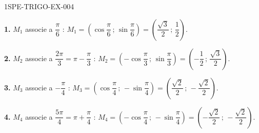 \begin{corrige}{1SPE-TRIGO-EX-004}


\textbf{1.} $M_1$ associe a $\dfrac{\pi}{6}$ : $M_1 = \left(\cos\dfrac{\pi}{6}\,;\,\sin\dfrac{\pi}{6}\right) = \left(\dfrac{\sqrt{3}}{2}\,;\,\dfrac{1}{2}\right)$.

\textbf{2.} $M_2$ associe a $\dfrac{2\pi}{3} = \pi - \dfrac{\pi}{3}$ : $M_2 = \left(-\cos\dfrac{\pi}{3}\,;\,\sin\dfrac{\pi}{3}\right) = \left(-\dfrac{1}{2}\,;\,\dfrac{\sqrt{3}}{2}\right)$.

\textbf{3.} $M_3$ associe a $-\dfrac{\pi}{4}$ : $M_3 = \left(\cos\dfrac{\pi}{4}\,;\,-\sin\dfrac{\pi}{4}\right) = \left(\dfrac{\sqrt{2}}{2}\,;\,-\dfrac{\sqrt{2}}{2}\right)$.

\textbf{4.} $M_4$ associe a $\dfrac{5\pi}{4} = \pi + \dfrac{\pi}{4}$ : $M_4 = \left(-\cos\dfrac{\pi}{4}\,;\,-\sin\dfrac{\pi}{4}\right) = \left(-\dfrac{\sqrt{2}}{2}\,;\,-\dfrac{\sqrt{2}}{2}\right)$.

\end{corrige}
